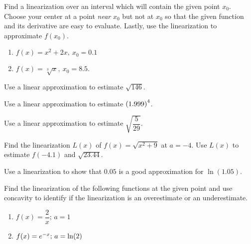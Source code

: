 \documentclass[answers]{exam}
\begin{document}
\begin{ex*}
  Find a linearization over an interval which will contain the given point $x_0$. Choose your center at a point \textit{near} $x_0$ but not at $x_0$ so that the given function and its derivative are easy to evaluate. Lastly, use the linearization to approximate $f(x_0)$.
\end{ex*}
\begin{enumerate}[label=\alph*), itemsep=\stretch{1}]
  \item $f(x)=x^2+2x,\ x_0=0.1$
  \item $f(x)=\sqrt[3]{x},\ x_0=8.5$.
\end{enumerate}
\pagebreak

\begin{ex*}
  Use a linear approximation to estimate $\sqrt{146}$.
\end{ex*}

\begin{ex*}
  Use a linear approximation to estimate $\parens{1.999}^4$.
\end{ex*}

\begin{ex*}
  Use a linear approximation to estimate $\sqrt{\dfrac{5}{29}}$.
\end{ex*}
\pagebreak

\begin{ex*}
  Find the linearization $L(x)$ of $f(x)=\sqrt{x^2+9}$ at $a=-4$. Use $L(x)$ to estimate $f(-4.1)$ and $\sqrt{23.44}$.
\end{ex*}
\pagebreak

\begin{ex*}
  Use a linearization to show that $0.05$ is a good approximation for $\ln(1.05)$.
\end{ex*}
\pagebreak

\begin{ex*}
  Find the linearization of the following functions at the given point and use concavity to identify if the linearization is an overestimate or an underestimate.
\end{ex*}
\begin{enumerate}[label=\alph*),itemsep=\stretch{1}]
  \item $f(x)=\dfrac{2}{x};\, a=1$
  \item $f(x)=e\inv[x];\, a=\ln(2)$
\end{enumerate}
\end{document}
